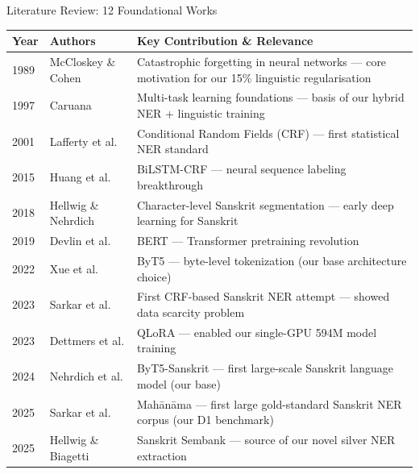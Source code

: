 
\begin{frame}{Literature Review: 12 Foundational Works}
  \centering
  \footnotesize
  \begin{tabular}{p{0.8cm}p{3.8cm}p{5.8cm}}
    \toprule
    \textbf{Year} & \textbf{Authors} & \textbf{Key Contribution \& Relevance} \\
    \midrule
    1989 & McCloskey \& Cohen & Catastrophic forgetting in neural networks — core motivation for our 15\% linguistic regularisation \\
    1997 & Caruana & Multi-task learning foundations — basis of our hybrid NER + linguistic training \\
    2001 & Lafferty et al. & Conditional Random Fields (CRF) — first statistical NER standard \\
    2015 & Huang et al. & BiLSTM-CRF — neural sequence labeling breakthrough \\
    2018 & Hellwig \& Nehrdich & Character-level Sanskrit segmentation — early deep learning for Sanskrit \\
    2019 & Devlin et al. & BERT — Transformer pretraining revolution \\
    2022 & Xue et al. & ByT5 — byte-level tokenization (our base architecture choice) \\
    2023 & Sarkar et al. & First CRF-based Sanskrit NER attempt — showed data scarcity problem \\
    2023 & Dettmers et al. & QLoRA — enabled our single-GPU 594M model training \\
    2024 & Nehrdich et al. & ByT5-Sanskrit — first large-scale Sanskrit language model (our base) \\
    2025 & Sarkar et al. & Mahānāma — first large gold-standard Sanskrit NER corpus (our D1 benchmark) \\
    2025 & Hellwig \& Biagetti & Sanskrit Sembank — source of our novel silver NER extraction \\
    \bottomrule
  \end{tabular}
\end{frame}

